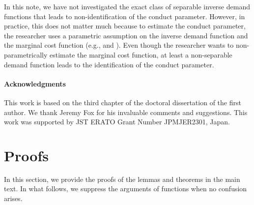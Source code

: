 \documentclass[11pt, a4paper]{article}
\theoremstyle{remark}
\begin{document}
In this note, we have not investigated the exact class of separable inverse demand functions that leads to non-identification of the conduct parameter.
However, in practice, this does not matter much because to estimate the conduct parameter, the researcher uses a parametric assumption on the inverse demand function and the marginal cost function (e.g., \citet{okazaki2022excess} and \citet{matsumura2024loglinear}).
Even though the researcher wants to non-parametrically estimate the marginal cost function, at least a non-separable demand function leads to the identification of the conduct parameter.

\paragraph{Acknowledgments}
This work is based on the third chapter of the doctoral dissertation of the first author.
We thank Jeremy Fox for his invaluable comments and suggestions.
This work was supported by JST ERATO Grant Number JPMJER2301, Japan.  


\newpage



\appendix

\section{Proofs}\label{appendix:proof}
In this section, we provide the proofs of the lemmas and theorems in the main text.
In what follows, we suppress the arguments of functions when no confusion arises.
\end{document}
